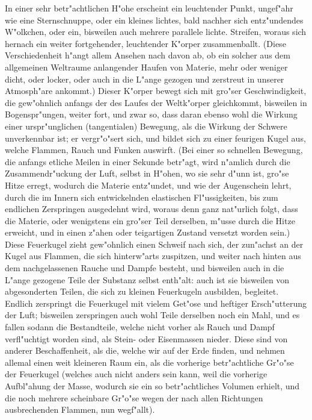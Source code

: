 \documentclass[a4paper, 11pt, oneside, polutonikogreek, german]{article}
\begin{document}
In einer sehr betr"achtlichen H"ohe erscheint ein leuchtender Punkt, ungef"ahr wie eine Sternschnuppe, oder ein kleines lichtes, bald nachher sich entz"undendes W"olkchen, oder ein, bisweilen auch mehrere parallele lichte. Streifen, woraus sich hernach ein weiter fortgehender, leuchtender K"orper zusammenballt. (Diese Verschiedenheit h"angt allem Ansehen nach davon ab, ob ein solcher aus dem allgemeinen Weltraume anlangender Haufen von Materie, mehr oder weniger dicht, oder locker, oder auch in die L"ange gezogen und zerstreut in unserer Atmosph"are ankommt.) Dieser K"orper bewegt sich mit gro"ser Geschwindigkeit, die gew"ohnlich anfangs der des Laufes der Weltk"orper gleichkommt, bisweilen in Bogenspr"ungen, weiter fort, und zwar so, dass daran ebenso wohl die Wirkung einer urspr"unglichen (tangentialen) Bewegung, als die Wirkung der Schwere unverkennbar ist; er vergr"o"sert sich, und bildet sich zu einer feurigen Kugel aus, welche Flammen, Rauch und Funken auswirft. (Bei einer so schnellen Bewegung, die anfangs etliche Meilen in einer Sekunde betr"agt, wird n"amlich durch die Zusammendr"uckung der Luft, selbst in H"ohen, wo sie sehr d"unn ist, gro"se Hitze erregt, wodurch die Materie entz"undet, und wie der Augenschein lehrt, durch die im Innern sich entwickelnden elastischen Fl"ussigkeiten, bis zum endlichen Zerspringen ausgedehnt wird, woraus denn ganz nat"urlich folgt, dass die Materie, oder wenigstens ein gro"ser Teil derselben, m"usse durch die Hitze erweicht, und in einen z"ahen oder teigartigen Zustand versetzt worden sein.) Diese Feuerkugel zieht gew"ohnlich einen Schweif nach sich, der zun"achst an der Kugel aus Flammen, die sich hinterw"arts zuspitzen, und weiter nach hinten aus dem nachgelassenen Rauche und Dampfe besteht, und bisweilen auch in die L"ange gezogene Teile der Substanz selbst enth"alt: auch ist sie bisweilen von abgesonderten Teilen, die sich zu kleinen Feuerkugeln ausbilden, begleitet. Endlich zerspringt die Feuerkugel mit vielem Get"ose und heftiger Ersch"utterung der Luft; bisweilen zerspringen auch wohl Teile derselben noch ein Mahl, und es fallen sodann die Bestandteile, welche nicht vorher als Rauch und Dampf verfl"uchtigt worden sind, als Stein- oder Eisenmassen nieder. Diese sind von anderer Beschaffenheit, als die, welche wir auf der Erde finden, und nehmen allemal einen weit kleineren Raum ein, als die vorherige betr"achtliche Gr"o"se der Feuerkugel (welches auch nicht anders sein kann, weil die vorherige Aufbl"ahung der Masse, wodurch sie ein so betr"achtliches Volumen erhielt, und die noch mehrere scheinbare Gr"o"se wegen der nach allen Richtungen ausbrechenden Flammen, nun wegf"allt).
\end{document}
